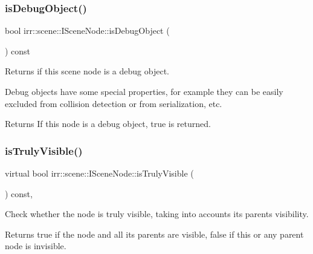 \subsubsection{\texorpdfstring{is\+Debug\+Object()}{isDebugObject()}\hspace{0.1cm}{\footnotesize\ttfamily [2/2]}}
{\footnotesize\ttfamily bool irr\+::scene\+::\+I\+Scene\+Node\+::is\+Debug\+Object (\begin{DoxyParamCaption}{ }\end{DoxyParamCaption}) const\hspace{0.3cm}{\ttfamily [inline]}}



Returns if this scene node is a debug object. 

Debug objects have some special properties, for example they can be easily excluded from collision detection or from serialization, etc. \begin{DoxyReturn}{Returns}
If this node is a debug object, true is returned. 
\end{DoxyReturn}
\mbox{\label{classirr_1_1scene_1_1ISceneNode_a457fda8e5bca28a1c7af1691fefd4f75}} 
\subsubsection{\texorpdfstring{is\+Truly\+Visible()}{isTrulyVisible()}\hspace{0.1cm}{\footnotesize\ttfamily [1/2]}}
{\footnotesize\ttfamily virtual bool irr\+::scene\+::\+I\+Scene\+Node\+::is\+Truly\+Visible (\begin{DoxyParamCaption}{ }\end{DoxyParamCaption}) const\hspace{0.3cm}{\ttfamily [inline]}, {\ttfamily [virtual]}}



Check whether the node is truly visible, taking into accounts its parents\textquotesingle{} visibility. 

\begin{DoxyReturn}{Returns}
true if the node and all its parents are visible, false if this or any parent node is invisible. 
\end{DoxyReturn}
\mbox{\label{classirr_1_1scene_1_1ISceneNode_a457fda8e5bca28a1c7af1691fefd4f75}} 
